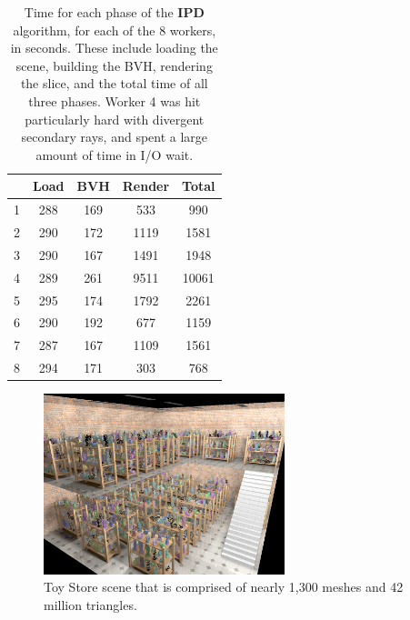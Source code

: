 \documentclass[a4paper,twoside]{article}
\begin{document}
\begin{table}
\begin{center}
\begin{tabular}{|l||c|c|c||c|}
    \hline
    & Load & BVH & Render & \textbf{Total}\\
    \hline
    \hline
    1 & 288 & 169 & 533 & 990 \\
    \hline
    2 & 290 & 172 & 1119 & 1581 \\
    \hline
    3 & 290 & 167 & 1491 & 1948 \\
    \hline
    4 & 289 & 261 & 9511 & 10061 \\
    \hline
    5 & 295 & 174 & 1792 & 2261 \\
    \hline
    6 & 290 & 192 & 677 & 1159 \\
    \hline
    7 & 287 & 167 & 1109 & 1561 \\
    \hline
    8 & 294 & 171 & 303 & 768 \\
    \hline
\end{tabular}
\caption{Time for each phase of the \textbf{IPD} algorithm, for each of the 8 workers, in seconds. These include loading the scene, building the BVH, rendering the slice, and the total time of all three phases. Worker 4 was hit particularly hard with divergent secondary rays, and spent a large amount of time in I/O wait.}
\label{tb:traditionaltimes}
\end{center}
\end{table}

\begin{figure}[h!]
    \centering
    \includegraphics[width=70mm]{showoff/toystore.png}
    \caption{Toy Store scene that is comprised of nearly 1,300 meshes and 42 million triangles.}
    \label{fig:sotoystore}
\end{figure}
\end{document}

